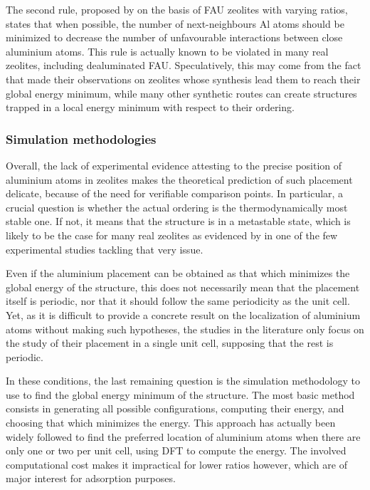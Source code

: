 \documentclass[main.tex]{subfiles}
\begin{document}
The second rule, proposed by \textcite{Dempsey} on the basis of FAU zeolites with varying \SiAl ratios, states that when possible, the number of next-neighbours Al atoms should be minimized to decrease the number of unfavourable interactions between close aluminium atoms. This rule is actually known to be violated in many real zeolites, including dealuminated FAU. Speculatively, this may come from the fact that \textcite{Dempsey} made their observations on zeolites whose synthesis lead them to reach their global energy minimum, while many other synthetic routes can create structures trapped in a local energy minimum with respect to their \SiAl ordering.

\subsubsection{Simulation methodologies}

Overall, the lack of experimental evidence attesting to the precise position of aluminium atoms in zeolites makes the theoretical prediction of such placement delicate, because of the need for verifiable comparison points. In particular, a crucial question is whether the actual \SiAl ordering is the thermodynamically most stable one\autocite{AlDistributionThermodynamic}. If not, it means that the structure is in a metastable state, which is likely to be the case for many real zeolites as evidenced by \textcite{ZeolitesAlPairs2} in one of the few experimental studies tackling that very issue.

Even if the aluminium placement can be obtained as that which minimizes the global energy of the structure, this does not necessarily mean that the placement itself is periodic, nor that it should follow the same periodicity as the unit cell. Yet, as it is difficult to provide a concrete result on the localization of aluminium atoms without making such hypotheses, the studies in the literature only focus on the study of their placement in a single unit cell, supposing that the rest is periodic.

In these conditions, the last remaining question is the simulation methodology to use to find the global energy minimum of the structure. The most basic method consists in generating all possible configurations, computing their energy, and choosing that which minimizes the energy. This approach has actually been widely followed to find the preferred location of aluminium atoms when there are only one or two  per unit cell, using DFT to compute the energy\autocite{AlDistributionThermodynamic,AlDistributionFAUDFT}. The involved computational cost makes it impractical for lower \SiAl ratios however, which are of major interest for adsorption purposes.
\end{document}
